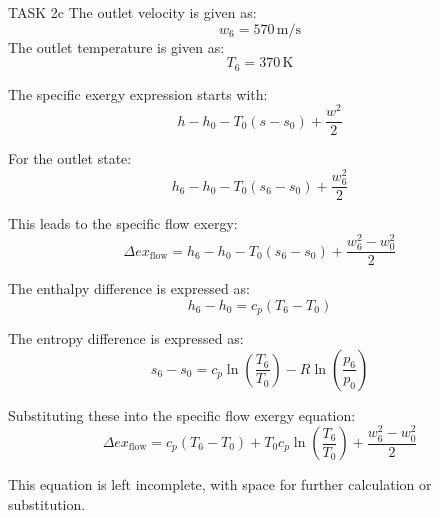 TASK 2c  
The outlet velocity is given as:  
\[
w_6 = 570 \, \text{m/s}
\]  
The outlet temperature is given as:  
\[
T_6 = 370 \, \text{K}
\]  

The specific exergy expression starts with:  
\[
h - h_0 - T_0 (s - s_0) + \frac{w^2}{2}
\]  

For the outlet state:  
\[
h_6 - h_0 - T_0 (s_6 - s_0) + \frac{w_6^2}{2}
\]  

This leads to the specific flow exergy:  
\[
\Delta ex_{\text{flow}} = h_6 - h_0 - T_0 (s_6 - s_0) + \frac{w_6^2 - w_0^2}{2}
\]  

The enthalpy difference is expressed as:  
\[
h_6 - h_0 = c_p (T_6 - T_0)
\]  

The entropy difference is expressed as:  
\[
s_6 - s_0 = c_p \ln \left( \frac{T_6}{T_0} \right) - R \ln \left( \frac{p_6}{p_0} \right)
\]  

Substituting these into the specific flow exergy equation:  
\[
\Delta ex_{\text{flow}} = c_p (T_6 - T_0) + T_0 c_p \ln \left( \frac{T_6}{T_0} \right) + \frac{w_6^2 - w_0^2}{2}
\]  

This equation is left incomplete, with space for further calculation or substitution.